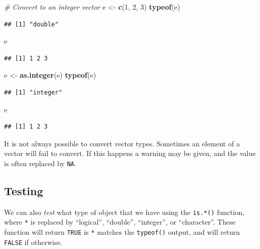 \documentclass[
]{book}
\newenvironment{Shaded}{\begin{snugshade}}{\end{snugshade}}
\newcommand{\CommentTok}[1]{\textcolor[rgb]{0.56,0.35,0.01}{\textit{#1}}}
\newcommand{\DecValTok}[1]{\textcolor[rgb]{0.00,0.00,0.81}{#1}}
\newcommand{\KeywordTok}[1]{\textcolor[rgb]{0.13,0.29,0.53}{\textbf{#1}}}
\newcommand{\NormalTok}[1]{#1}
\newcommand{\StringTok}[1]{\textcolor[rgb]{0.31,0.60,0.02}{#1}}
\begin{document}
\begin{Shaded}
\begin{Highlighting}[]
\CommentTok{# Convert to an integer vector}
\NormalTok{e <-}\StringTok{ }\KeywordTok{c}\NormalTok{(}\DecValTok{1}\NormalTok{, }\DecValTok{2}\NormalTok{, }\DecValTok{3}\NormalTok{)}
\KeywordTok{typeof}\NormalTok{(e)}
\end{Highlighting}
\end{Shaded}

\begin{verbatim}
## [1] "double"
\end{verbatim}

\begin{Shaded}
\begin{Highlighting}[]
\NormalTok{e}
\end{Highlighting}
\end{Shaded}

\begin{verbatim}
## [1] 1 2 3
\end{verbatim}

\begin{Shaded}
\begin{Highlighting}[]
\NormalTok{e <-}\StringTok{ }\KeywordTok{as.integer}\NormalTok{(e)}
\KeywordTok{typeof}\NormalTok{(e)}
\end{Highlighting}
\end{Shaded}

\begin{verbatim}
## [1] "integer"
\end{verbatim}

\begin{Shaded}
\begin{Highlighting}[]
\NormalTok{e}
\end{Highlighting}
\end{Shaded}

\begin{verbatim}
## [1] 1 2 3
\end{verbatim}

It is not always possible to convert vector types. Sometimes an element of a vector will fail to convert. If this happens a warning may be given, and the value is often replaced by \texttt{NA}.

\hypertarget{testing}{%
\subsection{Testing}\label{testing}}

We can also \emph{test} what type of object that we have using the \texttt{is.*()} function, where \texttt{*} is replaced by ``logical'', ``double'', ``integer'', or ``character''. These function will return \texttt{TRUE} is \texttt{*} matches the \texttt{typeof()} output, and will return \texttt{FALSE} if otherwise.
\end{document}

